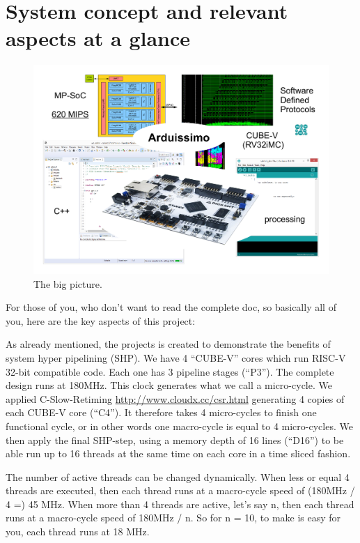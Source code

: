 \chapter{System concept and relevant aspects at a glance}

\begin{figure}[!t]
	\centering
	\includegraphics[width=6in]{figs/bigPicture}
	\caption{The big picture.}
	\label{overview}
\end{figure}

For those of you, who don't want to read the complete doc, so basically all of you, here are the key aspects of this project:

As already mentioned, the projects is created to demonstrate the benefits of system hyper pipelining (SHP). We have 4 “CUBE-V” cores which run RISC-V 32-bit compatible code. Each one has 3 pipeline stages (“P3”). The complete design runs at 180MHz.  This clock generates what we call a micro-cycle. We applied C-Slow-Retiming \url{http://www.cloudx.cc/csr.html} generating 4 copies of each CUBE-V core (“C4”). It therefore takes 4 micro-cycles to finish one functional cycle, or in other words one macro-cycle is equal to 4 micro-cycles. We then apply the final SHP-step, using a memory depth of 16 lines (“D16”) to be able run up to 16 threads at the same time on each core in a time sliced fashion. 

The number of active threads can be changed dynamically. When less or equal 4 threads are executed, then each thread runs at a macro-cycle speed of (180MHz / 4 =) 45 MHz. When more than 4 threads are active, let's say n, then each thread runs at a macro-cycle speed of 180MHz / n. So for n = 10, to make is easy for you, each thread runs at 18 MHz.


